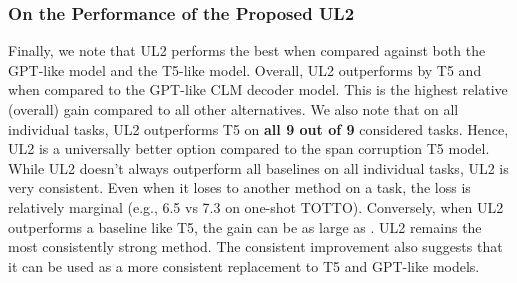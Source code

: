 \documentclass[10pt]{article}
\begin{document}
\subsubsection{On the Performance of the Proposed UL2}
Finally, we note that UL2 performs the best when compared against both the GPT-like model and the T5-like model. Overall, UL2 outperforms by T5  and  when compared to the GPT-like CLM decoder model. This is the highest relative (overall) gain compared to all other alternatives. We also note that on all individual tasks, UL2 outperforms T5 on \textbf{all 9 out of 9} considered tasks. Hence, UL2 is a universally better option compared to the span corruption T5 model. While UL2 doesn't always outperform all baselines on all individual tasks, UL2 is very consistent. Even when it loses to another method on a task, the loss is relatively marginal (e.g., 6.5 vs 7.3 on one-shot TOTTO). Conversely, when UL2 outperforms a baseline like T5, the gain can be as large as . UL2 remains the most consistently strong method. The consistent improvement also suggests that it can be used as a more consistent replacement to T5 and GPT-like models.
\end{document}
